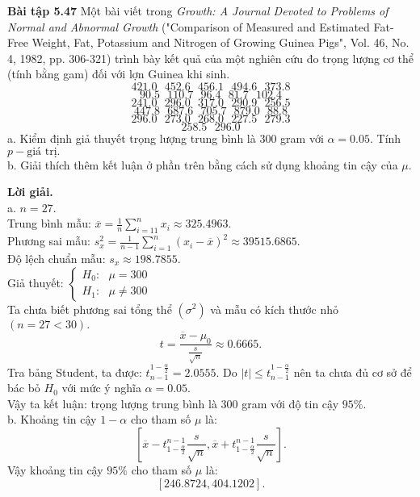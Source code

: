 \begin{mybox}
\textbf{Bài tập 5.47} Một bài viết trong \textit{Growth: A Journal Devoted to Problems of Normal and Abnormal Growth} ("Comparison of Measured and Estimated Fat-Free Weight, Fat, Potassium and Nitrogen of Growing Guinea Pigs", Vol. 46, No. 4, 1982, pp. 306-321) trình bày kết quả của một nghiên cứu đo trọng lượng cơ thể (tính bằng gam) đối với lợn Guinea khi sinh.
$$421.0 \text{ } 452.6 \text{ }456.1 \text{ } 494.6 \text{ } 373.8$$
$$90.5 \text{ } 110.7 \text{ } 96.4 \text{ } 81.7 \text{ } 102.4$$
$$241.0 \text{ } 296.0 \text{ } 317.0 \text{ } 290.9 \text{ } 256.5$$
$$447.8 \text{ } 687.6 \text{ } 705.7 \text{ } 879.0 \text{ } 88.8$$
$$296.0 \text{ } 273.0 \text{ } 268.0 \text{ } 227.5 \text{ } 279.3$$
$$258.5 \text{ } 296.0$$
a. Kiểm định giả thuyết trọng lượng trung bình là $300$ gram với $\alpha = 0.05.$ Tính $p-\text{giá trị}.$\\
b. Giải thích thêm kết luận ở phần trên bằng cách sử dụng khoảng tin cậy của $\mu.$
\end{mybox}
\textbf{Lời giải.}\\
a. $n = 27.$\\
Trung bình mẫu:
$\overline x  = \frac{1}{n}\sum\limits_{i =1 1}^n {{x_i}}  \approx 325.4963.$\\
Phương sai mẫu: $s_x^2 = \frac{1}{{n - 1}}\sum\limits_{i = 1}^n {{{\left( {{x_i} - \overline x } \right)}^2}}  \approx 39515.6865.$\\
Độ lệch chuẩn mẫu: ${s_x} \approx 198.7855.$\\
Giả thuyết: $\begin{cases}
H_0: \text{ } \mu = 300\\
H_1: \text{ } \mu \ne 300
\end{cases} $ \\
Ta chưa biết phương sai tổng thể $\left( {\sigma^2} \right)$ và mẫu có kích thước nhỏ $\left( {n = 27 < 30} \right).$
$$t = \frac{\overline{x} - \mu_0}{\frac{s}{\sqrt{n}}} \approx 0.6665.$$
Tra bảng Student, ta được: $t_{n - 1}^{1 - \frac{\alpha}{2}} = 2.0555.$
Do $\left| t \right| \leqslant t_{n - 1}^{1 - \frac{\alpha}{2}}$ nên ta chưa đủ cơ sở để bác bỏ $H_0$ với mức ý nghĩa $\alpha = 0.05.$\\
Vậy ta kết luận: trọng lượng trung bình là $300$ gram với độ tin cậy $95\%.$\\
b. Khoảng tin cậy $1 - \alpha$ cho tham số $\mu$ là:
$$\left[ {\overline x  - t_{1 - \frac{\alpha }{2}}^{n - 1}\frac{s}{{\sqrt n }},\overline x  + t_{1 - \frac{\alpha }{2}}^{n - 1}\frac{s}{{\sqrt n }}} \right].$$
Vậy khoảng tin cậy $95\%$ cho tham số $\mu$ là:
$$\left[ {246.8724, 404.1202} \right].$$

